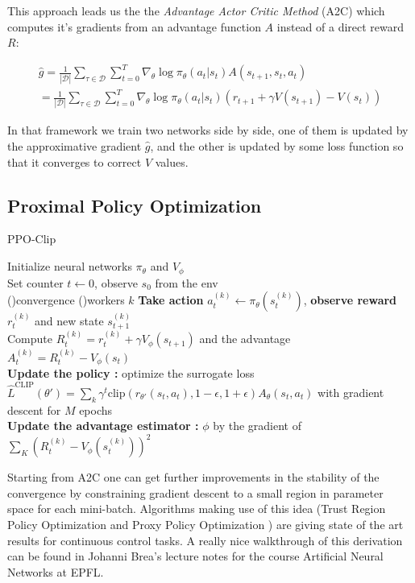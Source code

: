 This approach leads us the the \textit{Advantage Actor Critic Method} (A2C) which computes it's gradients from an advantage function $A$ instead of a direct reward $R$:

\begin{align*}
    \hat{g} = \frac{1}{|\mathcal{D}|} \sum_{\tau \in \mathcal{D}} \sum_{t=0}^{T} \nabla_\theta \log \pi_\theta (a_t|s_t) A(s_{t+1},s_t,a_t)\\
    = \frac{1}{|\mathcal{D}|} \sum_{\tau \in \mathcal{D}} \sum_{t=0}^{T} \nabla_\theta \log \pi_\theta (a_t|s_t) (r_{t+1} + \gamma V(s_{t+1}) - V(s_t))
\end{align*}

In that framework we train two networks side by side, one of them is updated by the approximative gradient $\hat{g}$, and the other is updated by some loss function so that it converges to correct $V$ values.

\subsection{Proximal Policy Optimization}
\label{sec:ppo}


\begin{algorithm}
    \caption{PPO-Clip}
    \label{ppo-clip}
    Initialize neural networks $\pi_\theta$ and $V_\phi$ \\
    Set counter $t \leftarrow 0$, observe $s_0$ from the env \\
    \Repeat(){convergence}{
        \ForAll(){workers $k$}{
            \textbf{Take action} $a_t^{(k)} \leftarrow \pi_\theta(s_t^{(k)})$, \textbf{observe reward} $r_t^{(k)}$ and new state $s_{t+1}^{(k)}$\\
            Compute $R_t^{(k)} =  r_t^{(k)} + \gamma V_\phi(s_{t+1})$ and the advantage $A^{(k)}_t = R_t^{(k)} - V_\phi(s_{t})$\\
        }
        \textbf{Update the policy :} optimize the surrogate loss $\hat{L}^\text{CLIP}(\theta') = \sum_{k} \gamma^t \text{clip}(r_{\theta'}(s_t,a_t),1-\epsilon,1+\epsilon) A_\theta(s_t,a_t)$ with gradient descent for $M$ epochs\\
        \textbf{Update the advantage estimator :} $\phi$ by the gradient of $\sum_K (R_t^{(k)} - V_\phi(s_t^(k)))^2$
    }
\end{algorithm}


Starting from A2C one can get further improvements in the stability of the convergence by constraining gradient descent to a small region in parameter space for each mini-batch. Algorithms making use of this idea (Trust Region Policy Optimization and Proxy Policy Optimization \cite{Schulman2017ProximalPO}) are giving state of the art results for continuous control tasks. A really nice walkthrough of this derivation can be found in Johanni Brea's lecture notes \cite{Brea} for the course Artificial Neural Networks at EPFL. \\

